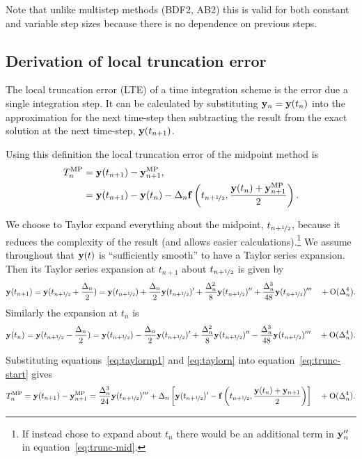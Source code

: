 Note that unlike multistep methods (\eg BDF2, AB2) this is valid for both constant and variable step sizes because there is no dependence on previous steps.


\subsection{Derivation of local truncation error}
\label{sec:deriv-local-trunc}

The local truncation error (LTE) of a time integration scheme is the error due a single integration step.
It can be calculated by substituting $\mathbf{y}_n = \mathbf{y}(t_n)$ into the approximation for the next time-step then subtracting the result from the exact solution at the next time-step, $\mathbf{y}(t_{n+1})$.

Using this definition the local truncation error of the midpoint method is
\begin{align}
  T_n^{\text{MP}} &= \mathbf{y}(t_{n+1}) - \mathbf{y}_{n+1}^{\text{MP}}, \notag\\
  &= \mathbf{y}(t_{n+1}) - \mathbf{y}(t_n) - \Delta_{n} {\mathbf{f}}\left( t_{n+\nicefrac{1}{2}}, \frac{\mathbf{y}(t_n) + \mathbf{y}_{n+1}^{\text{MP}}}{2} \right).
  \label{eq:trunc-start}
\end{align}

We choose to Taylor expand everything about the midpoint, $t_{n+\nicefrac{1}{2}}$, because it reduces the complexity of the result (and allows easier calculations).\footnote{If instead chose to expand about $t_n$ there would be an additional term in $\mathbf{y}_n''$ in equation~\eqref{eq:trunc-mid}.}
We assume throughout that $\mathbf{y}(t)$ is ``sufficiently smooth'' to have a Taylor series expansion. Then its Taylor series expansion at $t_{n+1}$ about $t_{n+\nicefrac{1}{2}}$ is given by
\begin{equation}
  \mathbf{y}(t_{n+1}) = \mathbf{y}(t_{n+\nicefrac{1}{2}} + \frac{\Delta_{n}}{2}) = \mathbf{y}(t_{n+\nicefrac{1}{2}}) + \frac{\Delta_{n}}{2} \mathbf{y}(t_{n+\nicefrac{1}{2}})' + \frac{\Delta_{n}^2}{8} \mathbf{y}(t_{n+\nicefrac{1}{2}})'' + \frac{\Delta_{n}^3}{48} \mathbf{y}(t_{n+\nicefrac{1}{2}})''' \quad + \text{O}(\Delta_{n}^4).
  \label{eq:taylornp1}
\end{equation}
Similarly the expansion at $t_n$ is
\begin{equation}
  \mathbf{y}(t_n) = \mathbf{y}(t_{n+\nicefrac{1}{2}} - \frac{\Delta_{n}}{2}) = \mathbf{y}(t_{n+\nicefrac{1}{2}}) - \frac{\Delta_{n}}{2} \mathbf{y}(t_{n+\nicefrac{1}{2}})' + \frac{\Delta_{n}^2}{8} \mathbf{y}(t_{n+\nicefrac{1}{2}})'' - \frac{\Delta_{n}^3}{48} \mathbf{y}(t_{n+\nicefrac{1}{2}})''' \quad + \text{O}(\Delta_{n}^4).
  \label{eq:taylorn}
\end{equation}

Substituting equations~\eqref{eq:taylornp1} and \eqref{eq:taylorn} into equation~\eqref{eq:trunc-start} gives
\begin{equation}
  T_n^{\text{MP}} = \mathbf{y}(t_{n+1}) - \mathbf{y}_{n+1}^{\text{MP}}
  = \frac{\Delta_{n}^3}{24} \mathbf{y}(t_{n+\nicefrac{1}{2}})'''  + \Delta_{n}  \left[ \mathbf{y}(t_{n+\nicefrac{1}{2}})'
  - {\mathbf{f}}\left( t_{n+\nicefrac{1}{2}}, \frac{\mathbf{y}(t_n) + \mathbf{y}_{n+1}}{2} \right) \right]  \quad + \text{O}(\Delta_{n}^4).
  \label{eq:trunc-mid}
\end{equation}

